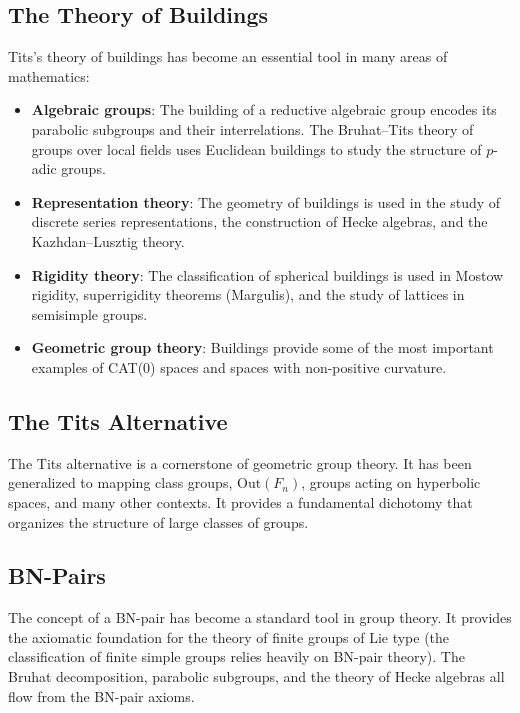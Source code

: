 \subsection{The Theory of Buildings}

Tits's theory of buildings has become an essential tool in many areas of mathematics:
\begin{itemize}
    \item \textbf{Algebraic groups}: The building of a reductive algebraic group encodes its parabolic subgroups and their interrelations. The Bruhat--Tits theory of groups over local fields uses Euclidean buildings to study the structure of \(p\)-adic groups.
    \item \textbf{Representation theory}: The geometry of buildings is used in the study of discrete series representations, the construction of Hecke algebras, and the Kazhdan--Lusztig theory.
    \item \textbf{Rigidity theory}: The classification of spherical buildings is used in Mostow rigidity, superrigidity theorems (Margulis), and the study of lattices in semisimple groups.
    \item \textbf{Geometric group theory}: Buildings provide some of the most important examples of CAT(0) spaces and spaces with non-positive curvature.
\end{itemize}

\subsection{The Tits Alternative}

The Tits alternative is a cornerstone of geometric group theory. It has been generalized to mapping class groups, \(\text{Out}(F_n)\), groups acting on hyperbolic spaces, and many other contexts. It provides a fundamental dichotomy that organizes the structure of large classes of groups.

\subsection{BN-Pairs}

The concept of a BN-pair has become a standard tool in group theory. It provides the axiomatic foundation for the theory of finite groups of Lie type (the classification of finite simple groups relies heavily on BN-pair theory). The Bruhat decomposition, parabolic subgroups, and the theory of Hecke algebras all flow from the BN-pair axioms.


